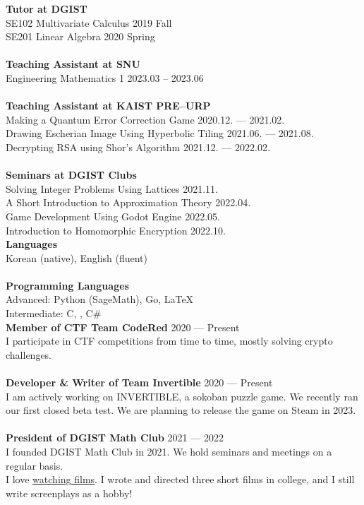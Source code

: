 \textbf{Tutor at DGIST} \\
SE102 Multivariate Calculus \hfill 2019 Fall \\
SE201 Linear Algebra \hfill 2020 Spring \\
\\
\textbf{Teaching Assistant at SNU} \\
Engineering Mathematics 1 \hfill 2023.03 -- 2023.06 \\
\\
\textbf{Teaching Assistant at KAIST PRE--URP} \\
Making a Quantum Error Correction Game \hfill 2020.12. --- 2021.02. \\
Drawing Escherian Image Using Hyperbolic Tiling \hfill 2021.06. --- 2021.08. \\
Decrypting RSA using Shor's Algorithm \hfill 2021.12. --- 2022.02. \\
\\
\textbf{Seminars at DGIST Clubs} \\
Solving Integer Problems Using Lattices \hfill 2021.11. \\
A Short Introduction to Approximation Theory \hfill 2022.04. \\
Game Development Using Godot Engine \hfill 2022.05. \\
Introduction to Homomorphic Encryption \hfill 2022.10. \\

\textbf{Languages} \\
Korean (native), English (fluent) \\
\\
\textbf{Programming Languages} \\
Advanced: Python (SageMath), Go, \LaTeX{}\\
Intermediate: C, \CC, C\# \\

\textbf{Member of CTF Team CodeRed} \hfill 2020 --- Present \\
I participate in CTF competitions from time to time, mostly solving crypto challenges. \\
\\
\textbf{Developer \& Writer of Team Invertible} \hfill 2020 --- Present \\
I am actively working on INVERTIBLE, a sokoban puzzle game. We recently ran our first closed beta test. We are planning to release the game on Steam in 2023. \\
\\
\textbf{President of DGIST Math Club} \hfill 2021 --- 2022 \\
I founded DGIST Math Club in 2021. We hold seminars and meetings on a regular basis. \\

I love \href{https://letterboxd.com/sp301415/}{watching films}. I wrote and directed three short films in college, and I still write screenplays as a hobby!


